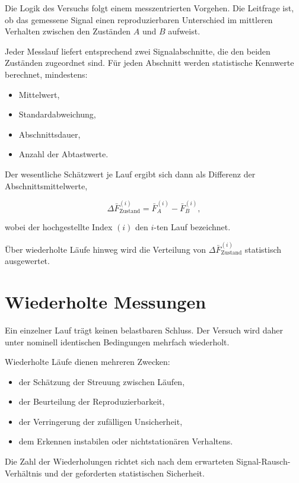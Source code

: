 \documentclass[12pt,a4paper]{report}
\begin{document}
Die Logik des Versuchs folgt einem messzentrierten Vorgehen. Die
Leitfrage ist, ob das gemessene Signal einen reproduzierbaren Unterschied
im mittleren Verhalten zwischen den Zuständen $A$ und $B$ aufweist.

Jeder Messlauf liefert entsprechend zwei Signalabschnitte, die den beiden
Zuständen zugeordnet sind. Für jeden Abschnitt werden statistische
Kennwerte berechnet, mindestens:

\begin{itemize}
\item Mittelwert,
\item Standardabweichung,
\item Abschnittsdauer,
\item Anzahl der Abtastwerte.
\end{itemize}

Der wesentliche Schätzwert je Lauf ergibt sich dann als Differenz der
Abschnittsmittelwerte,

\begin{equation}
\Delta \bar{F}^{(i)}_{\text{Zustand}} = \bar{F}^{(i)}_{A} - \bar{F}^{(i)}_{B},
\end{equation}

wobei der hochgestellte Index $(i)$ den $i$-ten Lauf bezeichnet.

Über wiederholte Läufe hinweg wird die Verteilung von
$\Delta \bar{F}^{(i)}_{\text{Zustand}}$ statistisch ausgewertet.

\section{Wiederholte Messungen}

Ein einzelner Lauf trägt keinen belastbaren Schluss. Der Versuch wird
daher unter nominell identischen Bedingungen mehrfach wiederholt.

Wiederholte Läufe dienen mehreren Zwecken:

\begin{itemize}
\item der Schätzung der Streuung zwischen Läufen,
\item der Beurteilung der Reproduzierbarkeit,
\item der Verringerung der zufälligen Unsicherheit,
\item dem Erkennen instabilen oder nichtstationären Verhaltens.
\end{itemize}

Die Zahl der Wiederholungen richtet sich nach dem erwarteten
Signal-Rausch-Verhältnis und der geforderten statistischen Sicherheit.
\end{document}
